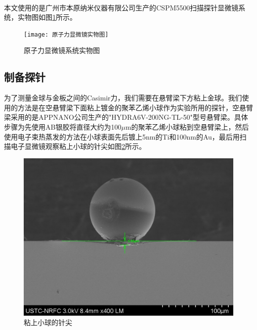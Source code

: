 \paragraph*{}
本文使用的是广州市本原纳米仪器有限公司生产的CSPM5500扫描探针显微镜系统，实物图如图\ref{fig:8}所示。
\begin{figure}
	\centering
	\texttt{[image: 原子力显微镜实物图]}
	\caption{原子力显微镜系统实物图}
	\label{fig:8}
\end{figure}
\subsection{制备探针}
为了测量金球与金板之间的Casimir力，我们需要在悬臂梁下方粘上金球。我们使用的方法是在空悬臂梁下面粘上镀金的聚苯乙烯小球作为实验所用的探针，空悬臂梁采用的是APPNANO公司生产的"HYDRA6V-200NG-TL-50"型号悬臂梁。具体步骤为先使用AB银胶将直径大约为100$\mu$m的聚苯乙烯小球粘到空悬臂梁上，然后使用电子束热蒸发的方法在小球表面先后镀上5nm的Ti和100nm的Au，最后用扫描电子显微镜观察粘上小球的针尖如图\ref{fig:9}所示。
\begin{figure}
	\centering
	\includegraphics[scale=0.4]{figures/粘小球的针尖}
	\caption{粘上小球的针尖}
	\label{fig:9}
\end{figure}
\newpage

